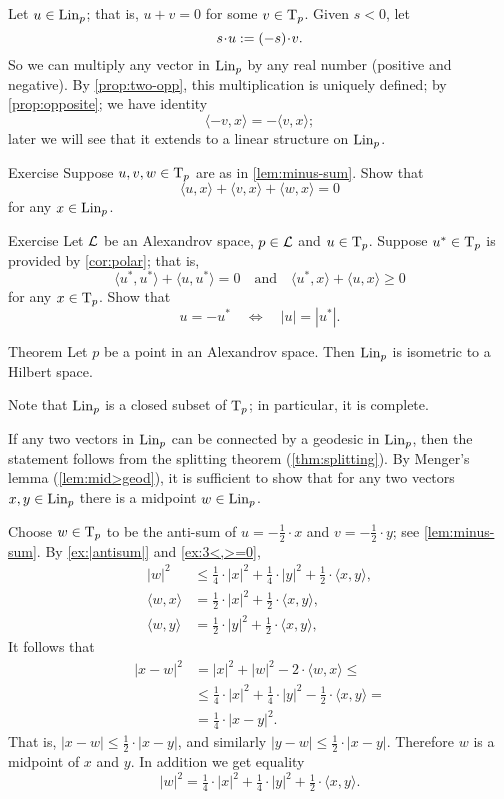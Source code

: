 Let $u\in \mathop{\rm Lin}\nolimits_p$; that is, $u+v=0$ for some $v\in\mathrm{T}_p$.
Given $s<0$, let 
\[s\cdot u\df (-s)\cdot v.\]
So we can multiply any vector in $\mathop{\rm Lin}\nolimits_p$ by any real number (positive and negative).
By \ref{prop:two-opp}, this multiplication is uniquely defined;
by \ref{prop:opposite}; we have identity
\[\langle -v,x\rangle=-\langle v,x\rangle;\]
later we will see that it extends to a linear structure on $\mathop{\rm Lin}\nolimits_p$.

\begin{thm}{Exercise}\label{ex:3<,>=0}
Suppose $u,v,w\in\mathrm{T}_p$ are as in \ref{lem:minus-sum}.
Show that
\[\langle u,x\rangle +\langle v,x\rangle +\langle w,x\rangle = 0\]
for any $x\in \mathop{\rm Lin}\nolimits_p$.
\end{thm}

\begin{thm}{Exercise}\label{ex:-u}
Let $\mathcal{L}$ be an Alexandrov space,
$p\in \mathcal{L}$ and $u\in \mathrm{T}_p$.
Suppose $u^*\in \mathrm{T}_p$ is provided by \ref{cor:polar};
that is, 
\[\langle u^*,u^*\rangle +\langle u,u^*\rangle = 0
\quad\text{and}\quad
\langle u^*,x\rangle +\langle u,x\rangle \ge 0
\]
for any $x\in \mathrm{T}_p$.
Show that 
\[u=-u^*\quad\Longleftrightarrow\quad|u|=|u^*|.\]
\end{thm}


\begin{thm}{Theorem}\label{thm:lin-subcone}
Let $p$ be a point in an Alexandrov space. 
Then $\mathop{\rm Lin}\nolimits_p$ is isometric to a Hilbert space.
\end{thm}

Note that $\mathop{\rm Lin}\nolimits_p$ is a closed subset of $\mathrm{T}_p$;
in particular, it is complete.

If any two vectors in $\mathop{\rm Lin}\nolimits_p$ can be connected by a geodesic in $\mathop{\rm Lin}\nolimits_p$,
then the statement follows from the splitting theorem (\ref{thm:splitting}).
By Menger's lemma (\ref{lem:mid>geod}), it is sufficient to show that for any two vectors $x,y\in\mathop{\rm Lin}\nolimits_p$
there is a midpoint $w\in \mathop{\rm Lin}\nolimits_p$.

Choose $w\in \mathrm{T}_p$ to be the anti-sum of $u=-\tfrac{1}{2}\cdot x$ and $v=-\tfrac{1}{2}\cdot y$;
see \ref{lem:minus-sum}.
By \ref{ex:|antisum|} and \ref{ex:3<,>=0},
\begin{align*}
|w|^2&\le \tfrac14\cdot |x|^2+\tfrac14\cdot|y|^2+\tfrac12\cdot\langle x,y\rangle,
\\
\langle w,x\rangle&= \tfrac12\cdot|x|^2+\tfrac12\cdot\langle x,y\rangle,
\\
\langle w,y\rangle&= \tfrac12\cdot|y|^2+\tfrac12\cdot\langle x,y\rangle,
\end{align*}
It follows that 
\begin{align*}
|x-w|^2
&= |x|^2+|w|^2-2\cdot\langle w,x\rangle\le
\\
&\le \tfrac14\cdot |x|^2+\tfrac14\cdot|y|^2-\tfrac12\cdot\langle x,y\rangle=
\\
&=\tfrac14\cdot|x-y|^2.
\end{align*}
That is, $|x-w|\le \tfrac12\cdot|x-y|$, and similarly $|y-w|\le \tfrac12\cdot|x-y|$.
Therefore $w$ is a midpoint of $x$ and $y$.
In addition we get equality 
\[|w|^2= \tfrac14\cdot |x|^2+\tfrac14\cdot|y|^2+\tfrac12\cdot\langle x,y\rangle.\]


